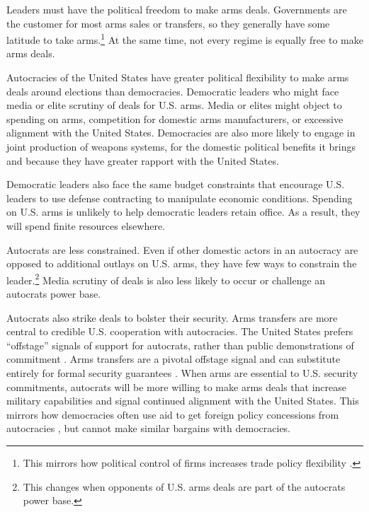 \documentclass[12pt]{article}
\begin{document}
Leaders must have the political freedom to make arms deals.
Governments are the customer for most arms sales or transfers, so they generally have some latitude to take arms.\footnote{This mirrors how political control of firms increases trade policy flexibility \citep{Davisetal2019}.}
At the same time, not every regime is equally free to make arms deals. 


Autocracies of the United States have greater political flexibility to make arms deals around elections than democracies. 
Democratic leaders who might face media or elite scrutiny of deals for U.S. arms.
Media or elites might object to spending on arms, competition for domestic arms manufacturers, or excessive alignment with the United States.
Democracies are also more likely to engage in joint production of weapons systems, for the domestic political benefits it brings and because they have greater rapport with the United States.


Democratic leaders also face the same budget constraints that encourage U.S. leaders to use defense contracting to manipulate economic conditions. 
Spending on U.S. arms is unlikely to help democratic leaders retain office. 
As a result, they will spend finite resources elsewhere. 


Autocrats are less constrained.
Even if other domestic actors in an autocracy are opposed to additional outlays on U.S. arms, they have few ways to constrain the leader.\footnote{This changes when opponents of U.S. arms deals are part of the autocrats power base.}
Media scrutiny of deals is also less likely to occur or challenge an autocrats power base. 


Autocrats also strike deals to bolster their security.
Arms transfers are more central to credible U.S. cooperation with autocracies.  
The United States prefers ``offstage'' signals of support for autocrats, rather than public demonstrations of commitment \citep{McManusYarhi-Milo2017}.
Arms transfers are a pivotal offstage signal and can substitute entirely for formal security guarantees \citep{Yarhi-Miloetal2016}. 
When arms are essential to U.S. security commitments, autocrats will be more willing to make arms deals that increase military capabilities and signal continued alignment with the United States.
This mirrors how democracies often use aid to get foreign policy concessions from autocracies \citep{BDMSmith2009}, but cannot make similar bargains with democracies. 
\end{document}
